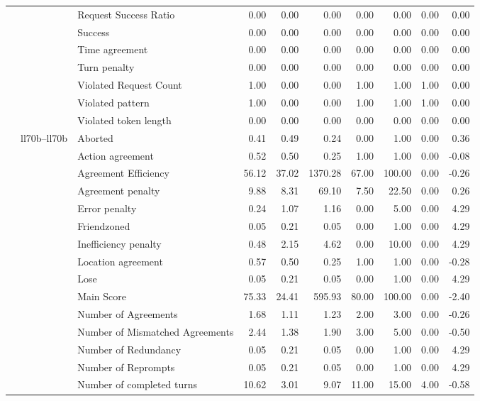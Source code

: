 \begin{tabular}{lllrrrrrrr}
 &  & Request Success Ratio & 0.00 & 0.00 & 0.00 & 0.00 & 0.00 & 0.00 & 0.00 \\
 &  & Success & 0.00 & 0.00 & 0.00 & 0.00 & 0.00 & 0.00 & 0.00 \\
 &  & Time agreement & 0.00 & 0.00 & 0.00 & 0.00 & 0.00 & 0.00 & 0.00 \\
 &  & Turn penalty & 0.00 & 0.00 & 0.00 & 0.00 & 0.00 & 0.00 & 0.00 \\
 &  & Violated Request Count & 1.00 & 0.00 & 0.00 & 1.00 & 1.00 & 1.00 & 0.00 \\
 &  & Violated pattern & 1.00 & 0.00 & 0.00 & 1.00 & 1.00 & 1.00 & 0.00 \\
 &  & Violated token length & 0.00 & 0.00 & 0.00 & 0.00 & 0.00 & 0.00 & 0.00 \\
\cline{2-10}
 & \multirow[t]{27}{*}{ll70b--ll70b} & Aborted & 0.41 & 0.49 & 0.24 & 0.00 & 1.00 & 0.00 & 0.36 \\
 &  & Action agreement & 0.52 & 0.50 & 0.25 & 1.00 & 1.00 & 0.00 & -0.08 \\
 &  & Agreement Efficiency & 56.12 & 37.02 & 1370.28 & 67.00 & 100.00 & 0.00 & -0.26 \\
 &  & Agreement penalty & 9.88 & 8.31 & 69.10 & 7.50 & 22.50 & 0.00 & 0.26 \\
 &  & Error penalty & 0.24 & 1.07 & 1.16 & 0.00 & 5.00 & 0.00 & 4.29 \\
 &  & Friendzoned & 0.05 & 0.21 & 0.05 & 0.00 & 1.00 & 0.00 & 4.29 \\
 &  & Inefficiency penalty & 0.48 & 2.15 & 4.62 & 0.00 & 10.00 & 0.00 & 4.29 \\
 &  & Location agreement & 0.57 & 0.50 & 0.25 & 1.00 & 1.00 & 0.00 & -0.28 \\
 &  & Lose & 0.05 & 0.21 & 0.05 & 0.00 & 1.00 & 0.00 & 4.29 \\
 &  & Main Score & 75.33 & 24.41 & 595.93 & 80.00 & 100.00 & 0.00 & -2.40 \\
 &  & Number of Agreements & 1.68 & 1.11 & 1.23 & 2.00 & 3.00 & 0.00 & -0.26 \\
 &  & Number of Mismatched Agreements & 2.44 & 1.38 & 1.90 & 3.00 & 5.00 & 0.00 & -0.50 \\
 &  & Number of Redundancy & 0.05 & 0.21 & 0.05 & 0.00 & 1.00 & 0.00 & 4.29 \\
 &  & Number of Reprompts & 0.05 & 0.21 & 0.05 & 0.00 & 1.00 & 0.00 & 4.29 \\
 &  & Number of completed turns & 10.62 & 3.01 & 9.07 & 11.00 & 15.00 & 4.00 & -0.58 \\

\end{tabular}

